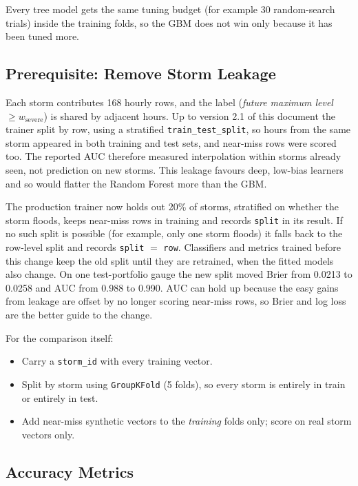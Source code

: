 \documentclass[11pt,a4paper]{article}
\begin{document}
\noindent Every tree model gets the same tuning budget (for example
30 random-search trials) inside the training folds, so the GBM does
not win only because it has been tuned more.

\subsection{Prerequisite: Remove Storm Leakage}
\label{sec:leakage}

Each storm contributes 168 hourly rows, and the label
(\emph{future maximum level} $\geq w_{\text{severe}}$) is shared by
adjacent hours.  Up to version 2.1 of this document the trainer split
by row, using a stratified \texttt{train\_test\_split}, so hours from
the same storm
appeared in both training and test sets, and near-miss rows were
scored too.  The reported AUC therefore measured interpolation within
storms already seen, not prediction on new storms.  This leakage
favours deep, low-bias learners and so would flatter the Random
Forest more than the GBM.

\noindent The production trainer now holds out 20\% of storms,
stratified on whether the storm floods, keeps near-miss rows in
training and records \texttt{split} in its result.  If no such split
is possible (for example, only one storm floods) it falls back to the
row-level split and records \texttt{split} $=$ \texttt{row}.
Classifiers and metrics trained before this change keep the old
split until they are retrained, when the fitted models also change.
On one test-portfolio gauge the new split moved Brier from 0.0213 to
0.0258 and AUC from 0.988 to 0.990.  AUC can hold up because the easy
gains from leakage are offset by no longer scoring near-miss rows, so
Brier and log loss are the better guide to the change.

\noindent For the comparison itself:
\begin{itemize}
  \item Carry a \texttt{storm\_id} with every training vector.
  \item Split by storm using \texttt{GroupKFold} (5 folds), so every
        storm is entirely in train or entirely in test.
  \item Add near-miss synthetic vectors to the \emph{training} folds
        only; score on real storm vectors only.
\end{itemize}

\subsection{Accuracy Metrics}
\end{document}
